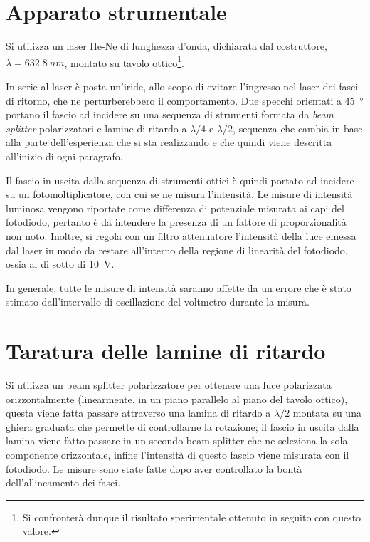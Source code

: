\documentclass[10pt,oneside,a4paper]{article}
\newenvironment{Figure}
  {\par\medskip\noindent\minipage{\linewidth}}
  {\endminipage\par\medskip}
\begin{document}
\begin{multicols}{2}
\section{Apparato strumentale}

Si utilizza un laser He-Ne di lunghezza d'onda, dichiarata dal costruttore, $\lambda = \SI{632.8}{nm}$, montato su tavolo ottico\footnote{Si confronterà dunque il risultato sperimentale ottenuto in seguito con questo valore.}. 

In serie al laser è posta un'iride, allo scopo di evitare l'ingresso nel laser dei fasci di ritorno, che ne perturberebbero il comportamento. Due specchi orientati a \SI{45}{\degree} portano il fascio ad incidere su una sequenza di strumenti formata da \emph{beam splitter} polarizzatori e lamine di ritardo a $\lambda/4$ e $\lambda/2$, sequenza che cambia in base alla parte dell'esperienza che si sta realizzando e che quindi viene descritta all'inizio di ogni paragrafo.

Il fascio in uscita dalla sequenza di strumenti ottici è quindi portato ad incidere su un fotomoltiplicatore, con cui se ne misura l'intensità.
Le misure di intensità luminosa vengono riportate come differenza di potenziale misurata ai capi del fotodiodo, pertanto è da intendere la presenza di un fattore di proporzionalità non noto. Inoltre, si regola con un filtro attenuatore l'intensità della luce emessa dal laser in modo da restare all'interno della regione di linearità del fotodiodo, ossia al di sotto di \SI{10}{V}. 

In generale, tutte le misure di intensità saranno affette da un errore che è stato stimato dall'intervallo di oscillazione del voltmetro durante la misura.


\section{Taratura delle lamine di ritardo}
Si utilizza un beam splitter polarizzatore per ottenere una luce polarizzata orizzontalmente (linearmente, in un piano parallelo al piano del tavolo ottico), questa viene fatta passare attraverso una lamina di ritardo a $\lambda/2$ montata su una ghiera graduata che permette di controllarne la rotazione; il fascio in uscita dalla lamina viene fatto passare in un secondo beam splitter che ne seleziona la sola componente orizzontale, infine l'intensità di questo fascio viene misurata con il fotodiodo. Le misure sono state fatte dopo aver controllato la bontà dell'allineamento dei fasci.


\end{multicols}
\end{document}
